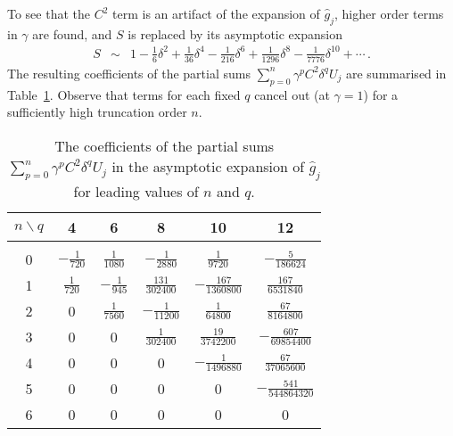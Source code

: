 \documentclass[12pt,a5paper]{article}
\begin{document}
To see that the $C^2$ term is an artifact of the expansion of $\hat{g}_j$, higher order terms in $\gamma$ are found,
and $S$ is replaced by its asymptotic expansion
\begin{eqnarray}
S & \sim & 1-\frac{1}{6}\delta^2+\frac{1}{36}\delta^4-\frac{1}{216}\delta^6+\frac{1}{1296}\delta^8-\frac{1}{7776}\delta^{10}+\cdots\,.
\end{eqnarray}
The resulting coefficients of the partial sums $\sum_{p=0}^{n}\gamma^p C^2\delta^qU_j$ are summarised in Table~\ref{tab:terms}.
Observe that terms for each fixed $q$ cancel out (at $\gamma=1$) for a sufficiently high truncation order $n$.
\begin{table}[hbt]
\centering
\begin{tabular}{|c|c|c|c|c|c|}
\hline
$n\backslash q$ & 4 & 6 & 8 & 10 & 12\\
\hline
&&&&&\\[-2ex]
0 & $-\frac{1}{720}$ & $\frac{1}{1080}$ & $-\frac{1}{2880}$        & $\frac{1}{9720}$            & $-\frac{5}{186624}$\\[1ex]
1 & $\frac{1}{720}$  & $-\frac{1}{945}$  & $\frac{131}{302400}$ & $-\frac{167}{1360800}$ & $\frac{167}{6531840}$\\[1ex]
2 & 0                          & $\frac{1}{7560}$  & $-\frac{1}{11200}$     & $\frac{1}{64800}$           & $\frac{67}{8164800}$\\[1ex]
3 & 0                          & 0                            & $\frac{1}{302400}$     & $\frac{19}{3742200}$     & $-\frac{607}{69854400}$\\[1ex]
4 & 0                          & 0                            & 0                                   & $-\frac{1}{1496880}$      & $\frac{67}{37065600}$\\[1ex]
5 & 0                          & 0                            & 0                                   & 0                                        & $-\frac{541}{544864320}$\\[1ex]
6 & 0                          & 0                            & 0                                   & 0                                        & 0\\[1ex]
\hline
\end{tabular}
\caption{The coefficients of the partial sums $\sum_{p=0}^{n}\gamma^pC^2\delta^q U_j$ in the 
asymptotic expansion of $\hat{g}_j$ for leading values of $n$ and $q$.}
\label{tab:terms}
\end{table}
\end{document}
